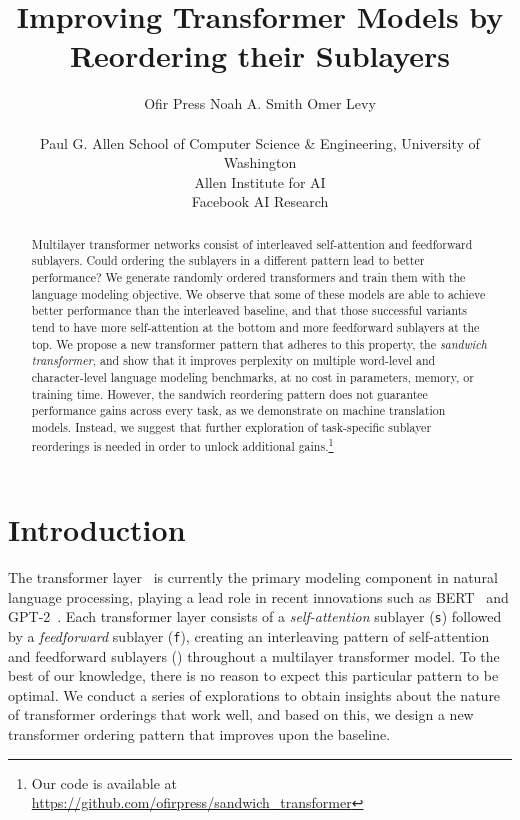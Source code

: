 \documentclass[11pt,a4paper]{article}
\title{Improving Transformer Models by Reordering their Sublayers}
\author{Ofir Press  \quad Noah A. Smith \quad Omer Levy\\
\\ Paul G. Allen School of Computer Science \& Engineering, University of Washington
\\ Allen Institute for AI
\\ Facebook AI Research
}
\date{}
\begin{document}
\maketitle




\begin{abstract}
Multilayer transformer networks consist of interleaved self-attention and feedforward sublayers.
Could ordering the sublayers in a different pattern lead to better performance?
We generate randomly ordered transformers and train them with the language modeling objective.
We observe that some of these models are able to achieve better performance than the interleaved baseline, and that those successful variants tend to have more self-attention at the bottom and more feedforward sublayers at the top.
We propose a new transformer pattern that adheres to this property, the \textit{sandwich transformer}, and show that it improves perplexity on multiple word-level and character-level language modeling benchmarks, at no cost in parameters, memory, or training time.
However, the sandwich reordering pattern does not guarantee performance gains across every task, as we demonstrate on machine translation models.
Instead, we suggest that further exploration of task-specific sublayer reorderings is needed in order to unlock additional gains.\footnote{Our code is available at \url{https://github.com/ofirpress/sandwich_transformer}} 
\end{abstract} \section{Introduction}



The transformer layer~\citep{AIAYN} is currently the primary modeling component in natural language processing, playing a lead role in recent innovations such as BERT~\citep{BERT} and GPT-2~\citep{gpt-2}.
Each transformer layer consists of a \textit{self-attention} sublayer ({\Large \texttt{\fs s}}) followed by a \textit{feedforward} sublayer  ({\Large \texttt{\fs f}}), creating an interleaving pattern of self-attention and feedforward sublayers ({\Large \texttt{}}\thinspace) throughout a multilayer transformer model.  
To the best of our knowledge, there is no   
reason to expect this particular pattern to be optimal.
We conduct a series of explorations to obtain insights about the nature of transformer orderings that work well, and based on this, we design a new transformer ordering pattern that improves upon the baseline. 
\end{document}
